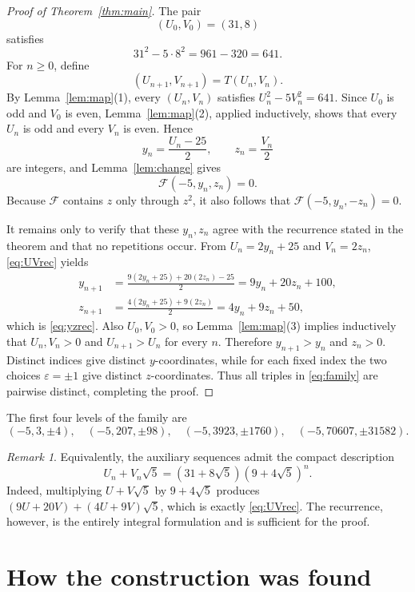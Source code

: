 \documentclass[11pt]{article}
\theoremstyle{remark}
\newtheorem{remark}{Remark}
\newcommand{\F}{\mathcal F}
\begin{document}
\begin{proof}[Proof of Theorem~\ref{thm:main}]
The pair
\[
 (U_0,V_0)=(31,8)
\]
satisfies
\[
 31^2-5\cdot 8^2=961-320=641.
\]
For $n\ge 0$, define
\begin{equation}\label{eq:UVrec}
 (U_{n+1},V_{n+1})=T(U_n,V_n).
\end{equation}
By Lemma~\ref{lem:map}(1), every $(U_n,V_n)$ satisfies
$U_n^2-5V_n^2=641$.  Since $U_0$ is odd and $V_0$ is even,
Lemma~\ref{lem:map}(2), applied inductively, shows that every $U_n$ is odd and every
$V_n$ is even.  Hence
\[
 y_n=\frac{U_n-25}{2},\qquad z_n=\frac{V_n}{2}
\]
are integers, and Lemma~\ref{lem:change} gives
\[
 \F(-5,y_n,z_n)=0.
\]
Because $\F$ contains $z$ only through $z^2$, it also follows that
$\F(-5,y_n,-z_n)=0$.

It remains only to verify that these $y_n,z_n$ agree with the recurrence stated in
the theorem and that no repetitions occur.  From $U_n=2y_n+25$ and $V_n=2z_n$,
\eqref{eq:UVrec} yields
\begin{align*}
 y_{n+1}
 &=\frac{9(2y_n+25)+20(2z_n)-25}{2}
   =9y_n+20z_n+100,\\
 z_{n+1}
 &=\frac{4(2y_n+25)+9(2z_n)}{2}
   =4y_n+9z_n+50,
\end{align*}
which is \eqref{eq:yzrec}.  Also $U_0,V_0>0$, so
Lemma~\ref{lem:map}(3) implies inductively that $U_n,V_n>0$ and
$U_{n+1}>U_n$ for every $n$.  Therefore $y_{n+1}>y_n$ and $z_n>0$.
Distinct indices give distinct $y$-coordinates, while for each fixed index the two
choices $\varepsilon=\pm1$ give distinct $z$-coordinates.  Thus all triples in
\eqref{eq:family} are pairwise distinct, completing the proof.
\end{proof}

The first four levels of the family are
\[
 (-5,3,\pm4),\quad
 (-5,207,\pm98),\quad
 (-5,3923,\pm1760),\quad
 (-5,70607,\pm31582).
\]

\begin{remark}\label{rem:closed}
Equivalently, the auxiliary sequences admit the compact description
\[
 U_n+V_n\sqrt5=(31+8\sqrt5)(9+4\sqrt5)^n.
\]
Indeed, multiplying $U+V\sqrt5$ by $9+4\sqrt5$ produces
$(9U+20V)+(4U+9V)\sqrt5$, which is exactly \eqref{eq:UVrec}.  The recurrence,
however, is the entirely integral formulation and is sufficient for the proof.
\end{remark}

\section{How the construction was found}
\end{document}
